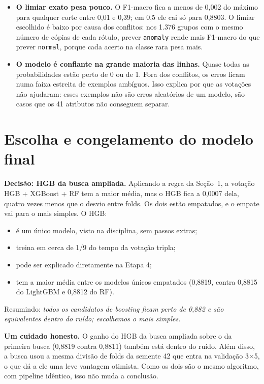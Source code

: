 \documentclass[11pt,a4paper]{article}
\begin{document}
\begin{itemize}
\item \textbf{O limiar exato pesa pouco.} O F1-macro fica a menos de 0,002 do máximo para qualquer corte entre 0,01 e 0,39; em 0,5 ele cai só para 0,8803. O limiar escolhido é baixo por causa dos conflitos: nos 1.376 grupos com o mesmo número de cópias de cada rótulo, prever \texttt{anomaly} rende mais F1-macro do que prever \texttt{normal}, porque cada acerto na classe rara pesa mais.
\item \textbf{O modelo é confiante na grande maioria das linhas.} Quase todas as probabilidades estão perto de 0 ou de 1. Fora dos conflitos, os erros ficam numa faixa estreita de exemplos ambíguos. Isso explica por que as votações não ajudaram: esses exemplos não são erros aleatórios de um modelo, são casos que os 41 atributos não conseguem separar.
\end{itemize}

\section{Escolha e congelamento do modelo final}

\textbf{Decisão: HGB da busca ampliada.} Aplicando a regra da Seção~1, a votação HGB + XGBoost + RF tem a maior média, mas o HGB fica a 0,0007 dela, quatro vezes menos que o desvio entre folds. Os dois estão empatados, e o empate vai para o mais simples. O HGB:
\begin{itemize}
\item é um único modelo, visto na disciplina, sem passos extras;
\item treina em cerca de 1/9 do tempo da votação tripla;
\item pode ser explicado diretamente na Etapa 4;
\item tem a maior média entre os modelos únicos empatados (0,8819, contra 0,8815 do LightGBM e 0,8812 do RF).
\end{itemize}

Resumindo: \emph{todos os candidatos de boosting ficam perto de 0,882 e são equivalentes dentro do ruído; escolhemos o mais simples.}

\textbf{Um cuidado honesto.} O ganho do HGB da busca ampliada sobre o da primeira busca (0,8819 contra 0,8811) também está dentro do ruído. Além disso, a busca usou a mesma divisão de folds da semente 42 que entra na validação 3$\times$5, o que dá a ele uma leve vantagem otimista. Como os dois são o mesmo algoritmo, com pipeline idêntico, isso não muda a conclusão.
\end{document}

